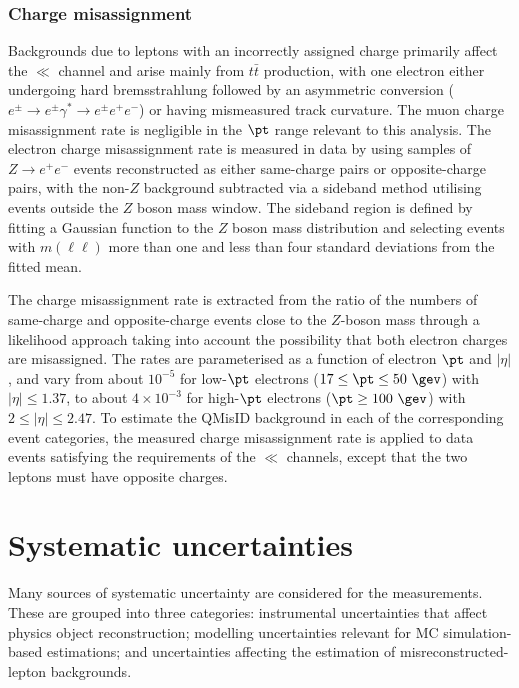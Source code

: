 \documentclass[cernpreprint, atlasdraft=false, texlive=2023, UKenglish, texmf, orcidlogo]{atlasdoc}
\begin{document}
\subsubsection{Charge misassignment}
\label{sec:bkg_reducible_chg_miss}
 
Backgrounds due to leptons with an incorrectly assigned charge
primarily affect the $\ll$ channel and arise mainly from $t\bar{t}$
production, with one electron either undergoing hard bremsstrahlung
followed by an asymmetric conversion ($e^\pm \to e^\pm \gamma^* \to
e^\pm e^+ e^-$) or having mismeasured track curvature.  The muon charge
misassignment rate is negligible in the $\pt$ range relevant to this
analysis. The electron charge misassignment rate is measured in data
by using samples of $Z \to e^+e^-$ events reconstructed as either same-charge
pairs or opposite-charge pairs, with the non-$Z$ background
subtracted via a sideband method utilising events outside the $Z$ boson mass
window. The sideband region is defined by fitting a Gaussian
function to the $Z$ boson mass distribution and selecting events with
$m(\ell\ell)$ more than one and less than four standard deviations
from the fitted mean.
 
The charge misassignment rate is extracted from the ratio of the
numbers of same-charge and opposite-charge events close to the $Z$-boson mass
through a likelihood approach taking into account the possibility that
both electron charges are misassigned. The rates are parameterised
as a function of electron $\pt$ and $|\eta|$, and vary from about
$10^{-5}$ for low-$\pt$ electrons ($17 \leq \pt \leq 50~\gev$) with
$|\eta| \leq 1.37$, to about $4 \times 10^{-3}$ for high-$\pt$
electrons ($\pt \geq 100~\gev$) with $2 \leq |\eta| \leq 2.47$.  To
estimate the QMisID background in each of the corresponding event
categories, the measured charge misassignment rate is applied to
data events satisfying the requirements of the $\ll$ channels, except
that the two leptons must have opposite charges.
 


 
\section{Systematic uncertainties}
\label{sec:systematics}

 
Many sources of systematic uncertainty are considered for the
\xs measurements. These are grouped
into three categories: instrumental uncertainties that affect physics
object reconstruction; modelling uncertainties relevant for MC
simulation-based estimations; and uncertainties affecting
the estimation of misreconstructed-lepton backgrounds.
 
\end{document}
